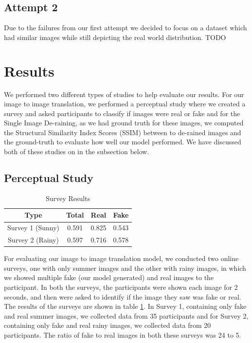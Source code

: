 \documentclass{article}
\begin{document}
\subsection{Attempt 2}

Due to the failures from our first attempt we decided to focus on a dataset which had similar  images while still depicting the real world distribution.  TODO

\section{Results}

We performed two different types of studies to help evaluate our results. For our image to image translation, we performed a perceptual study where we created a survey and asked participants to classify if images were real or fake and for the Single Image De-raining, as we had ground truth for these images, we computed the Structural Similarity Index Scores (SSIM) between to de-rained images and the ground-truth to evaluate how well our model performed. We have discussed both of these studies on in the subsection below.

\subsection{Perceptual Study}

\begin{table} [h!]
\centering
\begin{tabular}{ | c | c | c | c |}
\hline
 Type & Total & Real & Fake \\ 
\hline
 Survey 1 (Sunny) &  0.591 & 0.825 & 0.543 \\  
 Survey 2 (Rainy) & 0.597 & 0.716 & 0.578 \\
 \hline
\end{tabular}
\caption{Survey Results}
\label{table:1}
\end{table}

For evaluating our image to image translation model, we conducted two online surveys, one with only summer images and the other with rainy images, in which we showed multiple fake (our model generated) and real images to the participant. In both the surveys, the participants were shown each image for 2 seconds, and then were asked to identify if the image they saw was fake or real. The results of the surveys are shown in table \ref{table:1}. In Survey 1, containing only fake and real summer images, we collected data from 35 participants and for Survey 2, containing only fake and real rainy images, we collected data from 20 participants. The ratio of fake to real images in both these surveys was 24 to 5. 
\end{document}
